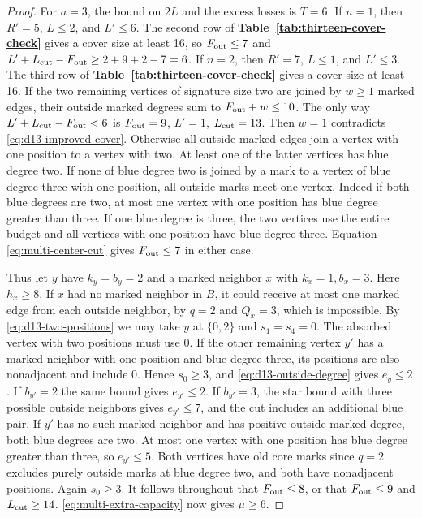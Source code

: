 \documentclass[preprint,11pt,numbers]{elsarticle-arxiv}
\numberwithin{equation}{section}
\theoremstyle{definition}
\begin{document}
\begin{proof}
For $a=3$, the bound on $2L$ and the excess losses is $T=6$.
If $n=1$, then $R'=5$, $L\le2$, and $L'\le6$. The second
row of \textbf{Table~\ref{tab:thirteen-cover-check}} gives a cover
size at least 16, so
$F_{\rm out}\le7$ and $L'+L_{\rm cut}-F_{\rm out}\ge2+9+2-7=6$.
If $n=2$, then $R'=7$, $L\le1$, and $L'\le3$. The third row
of \textbf{Table~\ref{tab:thirteen-cover-check}} gives a cover
size at least 16. If the two remaining vertices of signature size
two are joined by $w\ge1$ marked edges, their outside marked
degrees sum to $F_{\rm out}+w\le10$. The only way
$L'+L_{\rm cut}-F_{\rm out}<6$ is $F_{\rm out}=9$, $L'=1$,
$L_{\rm cut}=13$. Then $w=1$ contradicts
\eqref{eq:d13-improved-cover}. Otherwise all outside marked edges
join a vertex with one position to a vertex with two. At least one
of the latter vertices has blue degree two. If none of blue degree
two is joined by a mark to a vertex of blue degree three with one
position, all outside marks meet one vertex. Indeed if both blue
degrees are two, at most one vertex with one position has blue
degree greater than three. If one blue degree is three, the two
vertices use the entire budget and all vertices with one position
have blue degree three. Equation \eqref{eq:multi-center-cut} gives
$F_{\rm out}\le7$ in either case.

Thus let $y$ have $k_y=b_y=2$ and a marked neighbor $x$ with
$k_x=1,b_x=3$. Here $h_x\ge8$. If $x$ had no marked neighbor in
$B$, it could receive at most one marked edge from each outside
neighbor, by $q=2$ and $Q_x=3$, which is impossible. By
\eqref{eq:d13-two-positions} we may take $y$ at $\{0,2\}$ and
$s_1=s_4=0$. The absorbed vertex with two positions must use 0.
If the other remaining vertex $y'$ has a marked neighbor with one
position and blue degree three, its positions are also nonadjacent
and include 0. Hence $s_0\ge3$, and \eqref{eq:d13-outside-degree}
gives $e_y\le2$. If $b_{y'}=2$ the same bound gives $e_{y'}\le2$.
If $b_{y'}=3$, the star bound with three possible outside neighbors
gives $e_{y'}\le7$, and the cut includes an additional blue pair.
If $y'$ has no such marked neighbor and has positive outside marked
degree, both blue degrees are two. At most one vertex with one position
has blue degree greater than three, so $e_{y'}\le5$. Both vertices
have old core marks since $q=2$ excludes purely outside marks at
blue degree two, and both have nonadjacent positions. Again $s_0\ge3$.
It follows throughout that $F_{\rm out}\le8$, or that
$F_{\rm out}\le9$ and $L_{\rm cut}\ge14$.
\eqref{eq:multi-extra-capacity} now gives $\mu\ge6$.


\end{proof}
\end{document}
